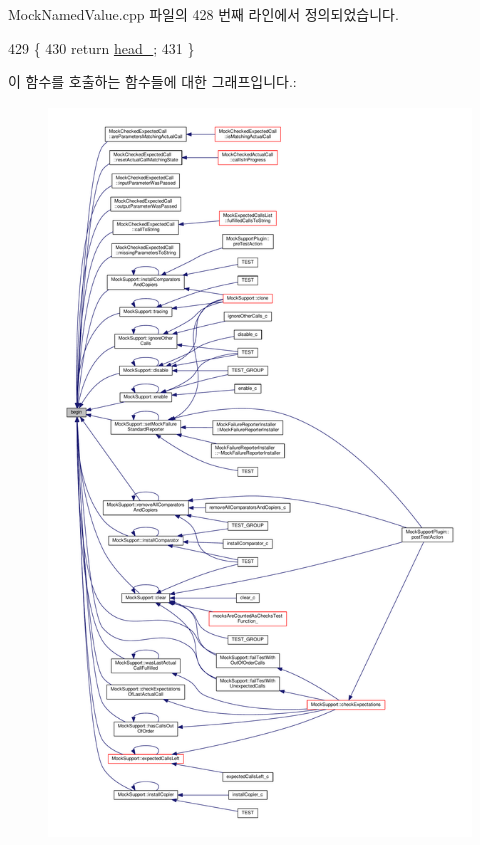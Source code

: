 Mock\+Named\+Value.\+cpp 파일의 428 번째 라인에서 정의되었습니다.


\begin{DoxyCode}
429 \{
430     \textcolor{keywordflow}{return} \hyperlink{class_mock_named_value_list_a3bb1ff05bd34f0ac2f0ff66d8f5e2978}{head\_};
431 \}
\end{DoxyCode}


이 함수를 호출하는 함수들에 대한 그래프입니다.\+:
\nopagebreak
\begin{figure}[H]
\begin{center}
\leavevmode
\includegraphics[height=550pt]{class_mock_named_value_list_a4a5976d05542385eb64ea73eee7fc59c_icgraph}
\end{center}
\end{figure}


